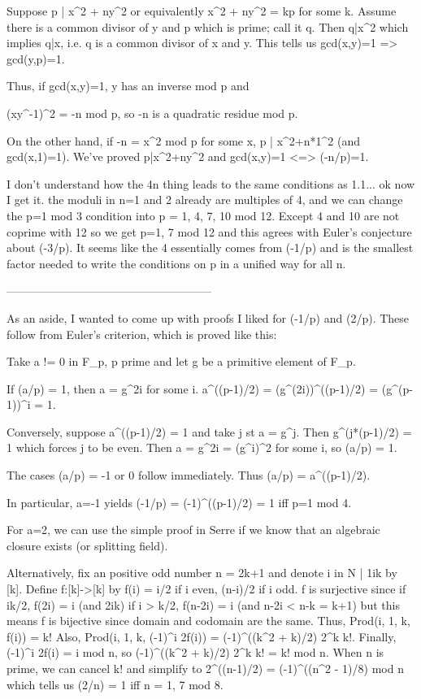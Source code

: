 Suppose p | x^2 + ny^2 or equivalently x^2 + ny^2 = kp for some k.
Assume there is a common divisor of y and p which is prime; call it q.
Then q|x^2 which implies q|x, i.e. q is a common divisor of x and y.
This tells us gcd(x,y)=1 => gcd(y,p)=1.

Thus, if gcd(x,y)=1, y has an inverse mod p and

(xy^-1)^2 = -n mod p, so -n is a quadratic residue mod p.

On the other hand, if -n = x^2 mod p for some x, p | x^2+n*1^2 (and gcd(x,1)=1).
We've proved p|x^2+ny^2 and gcd(x,y)=1 <=> (-n/p)=1.

I don't understand how the 4n thing leads to the same conditions as 1.1... ok now I get it. the moduli in n=1 and 2 already are multiples of 4, and we can change the p=1 mod 3 condition into p = 1, 4, 7, 10 mod 12. Except 4 and 10 are not coprime with 12 so we get p=1, 7 mod 12 and this agrees with Euler's conjecture about (-3/p). It seems like the 4 essentially comes from (-1/p) and is the smallest factor needed to write the conditions on p in a unified way for all n.

------------------------------------------------------

As an aside, I wanted to come up with proofs I liked for (-1/p) and (2/p). These follow from Euler's criterion, which is proved like this:

  Take a != 0 in F_p, p prime and let g be a primitive element of F_p.

  If (a/p) = 1, then a = g^{2i} for some i.
  a^((p-1)/2) = (g^(2i))^((p-1)/2) = (g^(p-1))^i = 1.

  Conversely, suppose a^((p-1)/2) = 1 and take j st a = g^j.
  Then g^(j*(p-1)/2) = 1 which forces j to be even. Then a = g^2i = (g^i)^2 for some i, so (a/p) = 1.

  The cases (a/p) = -1 or 0 follow immediately. Thus (a/p) = a^((p-1)/2).

In particular, a=-1 yields (-1/p) = (-1)^((p-1)/2) = 1 iff p=1 mod 4.

For a=2, we can use the simple proof in Serre if we know that an algebraic closure exists (or splitting field).

Alternatively, fix an positive odd number n = 2k+1 and denote {i in N | 1\leq i\leq k} by [k].
Define f:[k]->[k] by f(i) = i/2 if i even, (n-i)/2 if i odd.
f is surjective since if i\leq k/2, f(2i) = i (and 2i\leq k)
                      if i > k/2, f(n-2i) = i (and n-2i < n-k = k+1)
but this means f is bijective since domain and codomain are the same.
Thus, Prod(i, 1, k, f(i)) = k!
Also, Prod(i, 1, k, (-1)^i 2f(i)) = (-1)^((k^2 + k)/2) 2^k k!.
Finally, (-1)^i 2f(i) = i mod n, so (-1)^((k^2 + k)/2) 2^k k! = k! mod n.
When n is prime, we can cancel k! and simplify to
2^((n-1)/2) = (-1)^((n^2 - 1)/8) mod n which tells us (2/n) = 1 iff n = 1, 7 mod 8.

